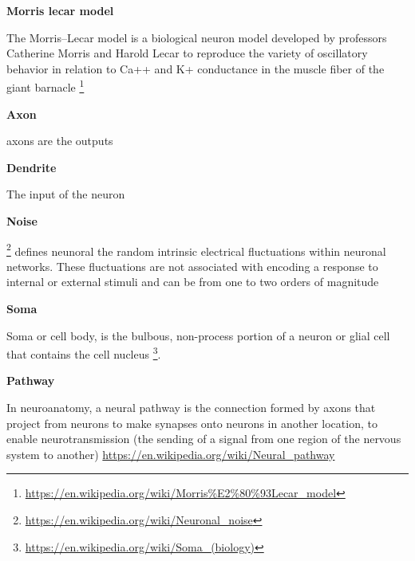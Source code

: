 \documentclass{book}
\providecommand{\ProjectDeepHeading}[2]{%
    \par\medskip\noindent\textbf{#2}\par\smallskip
}
\providecommand{\seeherefooter}[1]{\footnote{\url{#1}}}
\providecommand{\clickurlfooter}[1]{\footnote{\url{#1}}}
\begin{document}
\ProjectDeepHeading{7}{Morris lecar model}


The Morris–Lecar model is a biological neuron model developed by professors Catherine Morris and Harold Lecar to reproduce the variety of oscillatory behavior in relation to Ca++ and K+ conductance in the muscle fiber of the giant barnacle \seeherefooter{https://en.wikipedia.org/wiki/Morris\%E2\%80\%93Lecar_model}

\ProjectDeepHeading{4}{Axon}


axons are the outputs

\ProjectDeepHeading{4}{Dendrite}


The input of the neuron

\ProjectDeepHeading{4}{Noise}


\clickurlfooter{https://en.wikipedia.org/wiki/Neuronal_noise} defines neunoral the random intrinsic electrical fluctuations within neuronal networks. These fluctuations are not associated with encoding a response to internal or external stimuli and can be from one to two orders of magnitude

\ProjectDeepHeading{4}{Soma}


Soma or cell body, is the bulbous, non-process portion of a neuron or glial cell that contains the cell nucleus \seeherefooter{https://en.wikipedia.org/wiki/Soma_(biology)}.

\ProjectDeepHeading{3}{Pathway}


In neuroanatomy, a neural pathway is the connection formed by axons that project from neurons to make synapses onto neurons in another location, to enable neurotransmission (the sending of a signal from one region of the nervous system to another)   \url{https://en.wikipedia.org/wiki/Neural_pathway}
\end{document}
